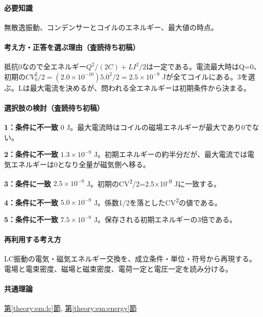 \paragraph{必要知識} 無散逸振動、コンデンサーとコイルのエネルギー、最大値の時点。

\paragraph{考え方・正答を選ぶ理由（査読待ち初稿）} 抵抗0なので全エネルギー\(Q^2/(2C)+LI^2/2\)は一定である。電流最大時はQ=\allowbreak{}0、初期の\(CV_0^2/2=(2.0\times10^{-10})5.0^2/2=2.5\times10^{-9}\) Jが全てコイルにある。3を選ぶ。Lは最大電流を決めるが、問われる全エネルギーは初期条件から決まる。

\paragraph{選択肢の検討（査読待ち初稿）}\mbox{}\par

\noindent\textbf{1：条件に不一致} 0 J。最大電流時はコイルの磁場エネルギーが最大であり0でない。\par

\noindent\textbf{2：条件に不一致} \(1.3\times10^{-9}\) J。初期エネルギーの約半分だが、最大電流では電気エネルギーは0となり全量が磁気側へ移る。\par

\noindent\textbf{3：条件に一致} \(2.5\times10^{-9}\) J。初期のCV\textsuperscript{2}/2=\allowbreak{}2.5×10\textsuperscript{-9} Jに一致する。\par

\noindent\textbf{4：条件に不一致} \(5.0\times10^{-9}\) J。係数1/2を落としたCV\textsuperscript{2}の値である。\par

\noindent\textbf{5：条件に不一致} \(7.5\times10^{-9}\) J。保存される初期エネルギーの3倍である。\par

\paragraph{再利用する考え方} LC振動の電気・磁気エネルギー交換を、成立条件・単位・符号から再現する。電場と電束密度、磁場と磁束密度、電荷一定と電圧一定を読み分ける。

\paragraph{共通理論} \hyperref[theory:em:lc]{第\ref*{theory:em:lc}節}, \hyperref[theory:em:energy]{第\ref*{theory:em:energy}節}

